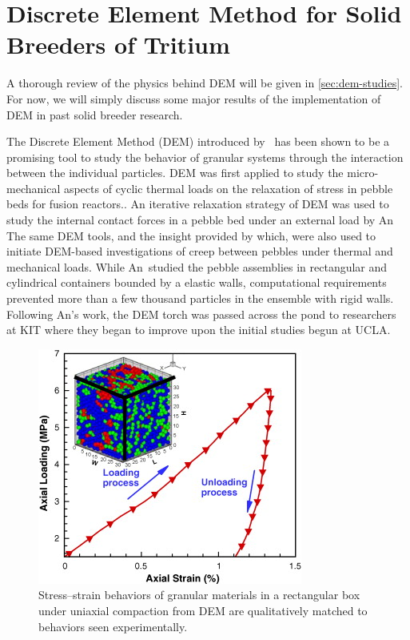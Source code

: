 \section{Discrete Element Method for Solid Breeders of Tritium}

A thorough review of the physics behind DEM will be given in \cref{sec:dem-studies}. For now, we will simply discuss some major results of the implementation of DEM in past solid breeder research.

The Discrete Element Method (DEM) introduced by~\cite{Cundall1979} has been shown to be a promising tool to study the behavior of granular systems through the interaction between the individual particles. DEM was first applied to study the micro-mechanical aspects of cyclic thermal loads on the relaxation of stress in pebble beds for fusion reactors.\cite{Lu2000b,Ying2002}. An iterative relaxation strategy of DEM was used to study the internal contact forces in a pebble bed under an external load by An\etal\cite{An20072233} The same DEM tools, and the insight provided by which, were also used to initiate DEM-based investigations of creep between pebbles under thermal and mechanical loads.\cite{An20071393} While An\etal~studied the pebble assemblies in rectangular and cylindrical containers bounded by a elastic walls, computational requirements prevented more than a few thousand particles in the ensemble with rigid walls.\cite{An20072233} Following An's work, the DEM torch was passed across the pond to researchers at KIT where they began to improve upon the initial studies begun at UCLA.

\begin{figure}[!ht]
    \centering
    \includegraphics[width=\singleimagewidth]{figures/1-s2.0-S092037960700049X-gr1.jpg}
    \caption{Stress–strain behaviors of granular materials in a rectangular box under uniaxial compaction from DEM are qualitatively matched to behaviors seen experimentally.}
\label{fig:an-uniaxial-compression}
\end{figure}

